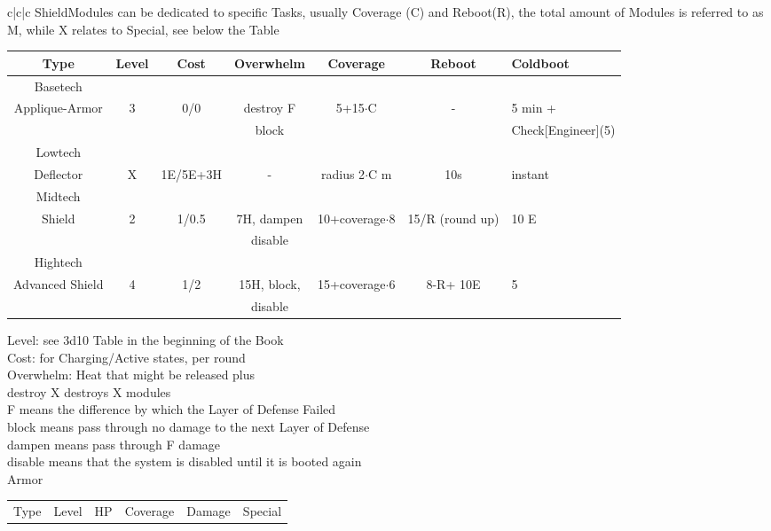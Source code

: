 \documentclass{article}
\newcommand\tab[1][1cm]{\hspace*{#1}}
\begin{document}
\begin{tabular}{c|c|c}
    ShieldModules can be dedicated to specific Tasks, usually
    Coverage (C) and Reboot(R), the total amount of Modules is referred to as M, while
    X relates to Special, see below the Table\newline
    \begin{tabular}{c|cccccl}
        Type & Level & Cost & Overwhelm & Coverage & Reboot & Coldboot \\
        \hline Basetech\\
        Applique-Armor & 3 & 0/0 & destroy F& 5+15\(\cdot\)C & -  & 5 min + \\
        &&&block&&& Check[Engineer](5) \\
        \hline Lowtech\\
        Deflector & X & 1E/5E+3H & - & radius 2\(\cdot\)C m & 10s & instant \\
        \hline Midtech\\
        Shield & 2 & 1/0.5 & 7H, dampen & 10+coverage\(\cdot\)8 & 15/R (round up) & 10 E \\
        & & & disable\\
        \hline Hightech\\
        Advanced Shield & 4 & 1/2 & 15H, block,& 15+coverage\(\cdot\)6 & 8-R+ 10E & 5 \\
        &&& disable\\
    \end{tabular}\newline\newline\newline
    Level: see 3d10 Table in the beginning of the Book\\
    Cost: for Charging/Active states, per round\\
    Overwhelm: Heat that might be released plus \\
    \tab destroy X destroys X modules\\
    \tab F means the difference by which the Layer of Defense Failed\\
    \tab block means pass through no damage to the next Layer of Defense\\
    \tab dampen means pass through F damage\\
    \tab disable means that the system is disabled until it is booted again\\
    \newline
    Armor\newline
    \begin{tabular}{c|cccll}
        Type & Level & HP & Coverage & Damage & Special\\

\end{tabular}
\end{tabular}
\end{document}
